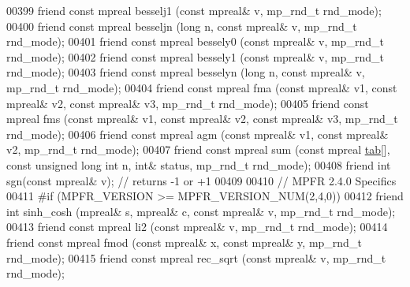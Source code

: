\begin{DoxyCode}
00399     \textcolor{keyword}{friend} \textcolor{keyword}{const} mpreal besselj1 (\textcolor{keyword}{const} mpreal& v, mp\_rnd\_t rnd\_mode);
00400     \textcolor{keyword}{friend} \textcolor{keyword}{const} mpreal besseljn (\textcolor{keywordtype}{long} n, \textcolor{keyword}{const} mpreal& v, mp\_rnd\_t rnd\_mode);
00401     \textcolor{keyword}{friend} \textcolor{keyword}{const} mpreal bessely0 (\textcolor{keyword}{const} mpreal& v, mp\_rnd\_t rnd\_mode);
00402     \textcolor{keyword}{friend} \textcolor{keyword}{const} mpreal bessely1 (\textcolor{keyword}{const} mpreal& v, mp\_rnd\_t rnd\_mode);
00403     \textcolor{keyword}{friend} \textcolor{keyword}{const} mpreal besselyn (\textcolor{keywordtype}{long} n, \textcolor{keyword}{const} mpreal& v, mp\_rnd\_t rnd\_mode);
00404     \textcolor{keyword}{friend} \textcolor{keyword}{const} mpreal fma      (\textcolor{keyword}{const} mpreal& v1, \textcolor{keyword}{const} mpreal& v2, \textcolor{keyword}{const} mpreal& v3, mp\_rnd\_t rnd\_mode);
00405     \textcolor{keyword}{friend} \textcolor{keyword}{const} mpreal fms      (\textcolor{keyword}{const} mpreal& v1, \textcolor{keyword}{const} mpreal& v2, \textcolor{keyword}{const} mpreal& v3, mp\_rnd\_t rnd\_mode);
00406     \textcolor{keyword}{friend} \textcolor{keyword}{const} mpreal agm      (\textcolor{keyword}{const} mpreal& v1, \textcolor{keyword}{const} mpreal& v2, mp\_rnd\_t rnd\_mode);
00407     \textcolor{keyword}{friend} \textcolor{keyword}{const} mpreal sum      (\textcolor{keyword}{const} mpreal \hyperlink{structtab}{tab}[], \textcolor{keyword}{const} \textcolor{keywordtype}{unsigned} \textcolor{keywordtype}{long} \textcolor{keywordtype}{int} n, \textcolor{keywordtype}{int}& status, mp\_rnd\_t 
      rnd\_mode);
00408     \textcolor{keyword}{friend} \textcolor{keywordtype}{int} sgn(\textcolor{keyword}{const} mpreal& v); \textcolor{comment}{// returns -1 or +1}
00409 
00410 \textcolor{comment}{// MPFR 2.4.0 Specifics}
00411 \textcolor{preprocessor}{#if (MPFR\_VERSION >= MPFR\_VERSION\_NUM(2,4,0))}
00412     \textcolor{keyword}{friend} \textcolor{keywordtype}{int}          sinh\_cosh   (mpreal& s, mpreal& c, \textcolor{keyword}{const} mpreal& v, mp\_rnd\_t rnd\_mode);
00413     \textcolor{keyword}{friend} \textcolor{keyword}{const} mpreal li2         (\textcolor{keyword}{const} mpreal& v,                       mp\_rnd\_t rnd\_mode);
00414     \textcolor{keyword}{friend} \textcolor{keyword}{const} mpreal fmod        (\textcolor{keyword}{const} mpreal& x, \textcolor{keyword}{const} mpreal& y,      mp\_rnd\_t rnd\_mode);
00415     \textcolor{keyword}{friend} \textcolor{keyword}{const} mpreal rec\_sqrt    (\textcolor{keyword}{const} mpreal& v,                       mp\_rnd\_t rnd\_mode);

\end{DoxyCode}
